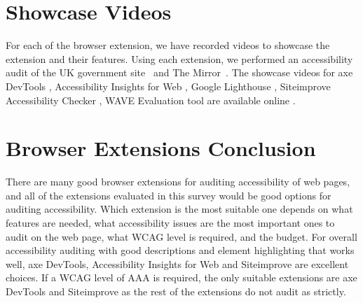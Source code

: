 \section{Showcase Videos}
For each of the browser extension, we have recorded videos to showcase the extension and their features.
Using each extension, we performed an accessibility audit of the UK government site~\parencite{GovUK} and The Mirror~\parencite{MirrorUK}.
The showcase videos for axe DevTools \parencite{axe_ext_vid}, Accessibility Insights for Web \parencite{aiweb_ext_vid}, Google Lighthouse \parencite{lighthouse_ext_vid}, Siteimprove Accessibility Checker \parencite{siteimprove_ext_vid}, WAVE Evaluation tool are available online \parencite{wave_ext_vid}.

\section{Browser Extensions Conclusion}
There are many good browser extensions for auditing accessibility of web pages, and all of the extensions evaluated in this survey would be good options for auditing accessibility.
Which extension is the most suitable one depends on what features are needed, what accessibility issues are the most important ones to audit on the web page, what WCAG level is required, and the budget.
For overall accessibility auditing with good descriptions and element highlighting that works well, axe DevTools, Accessibility Insights for Web and Siteimprove are excellent choices.
If a WCAG level of AAA is required, the only suitable extensions are axe DevTools and Siteimprove as the rest of the extensions do not audit as strictly.

